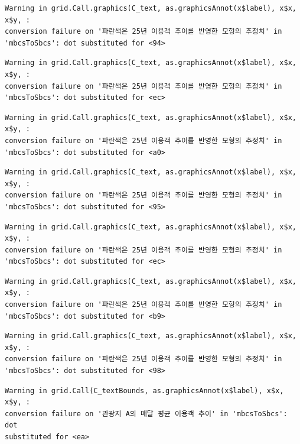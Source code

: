 \documentclass[
  letterpaper,
  DIV=11,
  numbers=noendperiod]{scrreprt}
\begin{document}
\begin{verbatim}
Warning in grid.Call.graphics(C_text, as.graphicsAnnot(x$label), x$x, x$y, :
conversion failure on '파란색은 25년 이용객 추이를 반영한 모형의 추정치' in
'mbcsToSbcs': dot substituted for <94>
\end{verbatim}

\begin{verbatim}
Warning in grid.Call.graphics(C_text, as.graphicsAnnot(x$label), x$x, x$y, :
conversion failure on '파란색은 25년 이용객 추이를 반영한 모형의 추정치' in
'mbcsToSbcs': dot substituted for <ec>
\end{verbatim}

\begin{verbatim}
Warning in grid.Call.graphics(C_text, as.graphicsAnnot(x$label), x$x, x$y, :
conversion failure on '파란색은 25년 이용객 추이를 반영한 모형의 추정치' in
'mbcsToSbcs': dot substituted for <a0>
\end{verbatim}

\begin{verbatim}
Warning in grid.Call.graphics(C_text, as.graphicsAnnot(x$label), x$x, x$y, :
conversion failure on '파란색은 25년 이용객 추이를 반영한 모형의 추정치' in
'mbcsToSbcs': dot substituted for <95>
\end{verbatim}

\begin{verbatim}
Warning in grid.Call.graphics(C_text, as.graphicsAnnot(x$label), x$x, x$y, :
conversion failure on '파란색은 25년 이용객 추이를 반영한 모형의 추정치' in
'mbcsToSbcs': dot substituted for <ec>
\end{verbatim}

\begin{verbatim}
Warning in grid.Call.graphics(C_text, as.graphicsAnnot(x$label), x$x, x$y, :
conversion failure on '파란색은 25년 이용객 추이를 반영한 모형의 추정치' in
'mbcsToSbcs': dot substituted for <b9>
\end{verbatim}

\begin{verbatim}
Warning in grid.Call.graphics(C_text, as.graphicsAnnot(x$label), x$x, x$y, :
conversion failure on '파란색은 25년 이용객 추이를 반영한 모형의 추정치' in
'mbcsToSbcs': dot substituted for <98>
\end{verbatim}

\begin{verbatim}
Warning in grid.Call(C_textBounds, as.graphicsAnnot(x$label), x$x, x$y, :
conversion failure on '관광지 A의 매달 평균 이용객 추이' in 'mbcsToSbcs': dot
substituted for <ea>
\end{verbatim}
\end{document}
